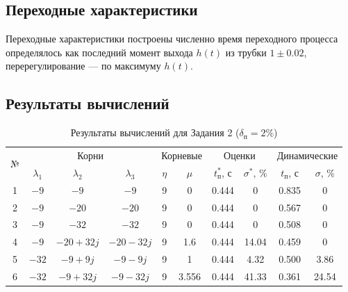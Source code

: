 \documentclass[14pt,a4paper]{extarticle}
\begin{document}
\subsection{Переходные характеристики}

Переходные характеристики построены численно время переходного процесса определялось как последний момент выхода $h(t)$ из трубки $1 \pm 0.02$, перерегулирование — по максимуму $h(t)$.


\subsection{Результаты вычислений}

\begin{table}[H]
\centering
\caption{Результаты вычислений для Задания 2 ($\delta_\text{п} = 2\%$)}
\label{tab:res}
\small
\begin{tabular}{c|ccc|cc|cc|cc}
\toprule
\multirow{2}{*}{№} & \multicolumn{3}{c|}{Корни} & \multicolumn{2}{c|}{Корневые} & \multicolumn{2}{c|}{Оценки} & \multicolumn{2}{c}{Динамические} \\
 & $\lambda_1$ & $\lambda_2$ & $\lambda_3$ & $\eta$ & $\mu$ & $t_\text{п}^*$, с & $\sigma^*$, \% & $t_\text{п}$, с & $\sigma$, \% \\
\midrule
1 & $-9$  & $-9$        & $-9$        & 9 & 0     & 0.444 & 0     & 0.835 & 0 \\
2 & $-9$  & $-20$       & $-20$       & 9 & 0     & 0.444 & 0     & 0.567 & 0 \\
3 & $-9$  & $-32$       & $-32$       & 9 & 0     & 0.444 & 0     & 0.508 & 0 \\
4 & $-9$  & $-20+32j$   & $-20-32j$   & 9 & 1.6   & 0.444 & 14.04 & 0.459 & 0 \\
5 & $-32$ & $-9+9j$     & $-9-9j$     & 9 & 1     & 0.444 & 4.32  & 0.500 & 3.86 \\
6 & $-32$ & $-9+32j$    & $-9-32j$    & 9 & 3.556 & 0.444 & 41.33 & 0.361 & 24.54 \\
\bottomrule
\end{tabular}
\end{table}
\end{document}
